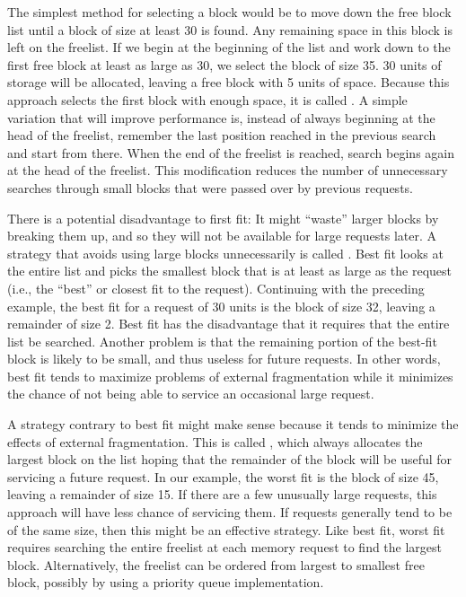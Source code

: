 
The simplest method for selecting a block would be to move down the
free block list until a block of size at least 30 is found.
Any remaining space in this block is left on the freelist.
If we begin at the beginning of the list and work down to the first
free block at least as large as 30, we select the block of size 35.
30 units of storage will be allocated, leaving a free block with 5
units of space.
Because this approach selects the first block with enough space, it is
called .
A simple variation that will improve performance is, instead of
always beginning at the head of the freelist, remember the last
position reached in the previous search and start from there.
When the end of the freelist is reached, search begins again at the
head of the freelist.
This modification reduces the number of unnecessary searches through
small blocks that were passed over by previous requests.

There is a potential disadvantage to first fit:
It might ``waste'' larger blocks by breaking them up, and so they will
not be available for large requests later.
A strategy that avoids using large blocks unnecessarily is called
.
Best fit looks at the entire list and picks the smallest block that
is at least as large as the request 
(i.e., the ``best'' or closest fit to the request).
Continuing with the preceding example, the best fit for a request of
30 units is the block of size 32, leaving a remainder of size 2.
Best fit has the disadvantage that it requires that the entire list be
searched.
Another problem is that the remaining portion of the best-fit block
is likely to be small, and thus useless for future requests.
In other words, best fit tends to maximize problems of external
fragmentation while it minimizes the chance of not being able to
service an occasional large request.

A strategy contrary to best fit might make sense because it tends to
minimize the effects of external fragmentation.
This is called , which always allocates the largest
block on the list hoping that the remainder of the block will be
useful for servicing a future
request.
In our example, the worst fit is the block of size 45, leaving a
remainder of size 15.
If there are a few unusually large requests, this approach
will have less chance of servicing them.
If requests generally tend to be of the same size, then this might be
an effective strategy.
Like best fit, worst fit requires searching the entire freelist at
each memory request to find the largest block.
Alternatively, the freelist can be ordered from largest to smallest
free block, possibly by using a priority queue implementation.

